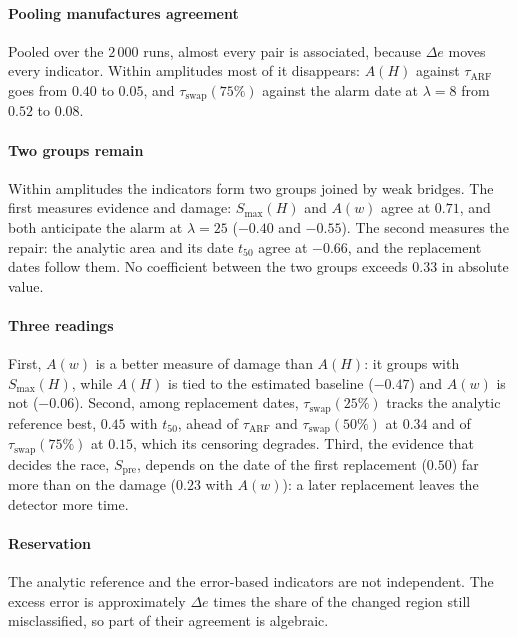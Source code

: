 \documentclass[10pt,conference]{IEEEtran}
\theoremstyle{definition}
\begin{document}
\paragraph{Pooling manufactures agreement} Pooled over the $2\,000$ runs, almost every
pair is associated, because $\Delta e$ moves every indicator. Within amplitudes most of it
disappears: $A(H)$ against $\tau_{\mathrm{ARF}}$ goes from $0.40$ to $0.05$, and
$\tau_{\mathrm{swap}}(75\%)$ against the alarm date at $\lambda = 8$ from $0.52$ to $0.08$.

\paragraph{Two groups remain} Within amplitudes the indicators form two groups joined by
weak bridges. The first measures evidence and damage: $S_{\max}(H)$ and $A(w)$ agree at
$0.71$, and both anticipate the alarm at $\lambda = 25$ ($-0.40$ and $-0.55$). The second
measures the repair: the analytic area and its date $t_{50}$ agree at $-0.66$, and the
replacement dates follow them. No coefficient between the two groups exceeds $0.33$ in
absolute value.

\paragraph{Three readings} First, $A(w)$ is a better measure of damage than $A(H)$: it
groups with $S_{\max}(H)$, while $A(H)$ is tied to the estimated baseline ($-0.47$) and
$A(w)$ is not ($-0.06$). Second, among replacement dates, $\tau_{\mathrm{swap}}(25\%)$
tracks the analytic reference best, $0.45$ with $t_{50}$, ahead of $\tau_{\mathrm{ARF}}$ and
$\tau_{\mathrm{swap}}(50\%)$ at $0.34$ and of $\tau_{\mathrm{swap}}(75\%)$ at $0.15$, which
its censoring degrades. Third, the evidence that decides the race, $S_{\mathrm{pre}}$,
depends on the date of the first replacement ($0.50$) far more than on the damage ($0.23$
with $A(w)$): a later replacement leaves the detector more time.

\paragraph{Reservation} The analytic reference and the error-based indicators are not
independent. The excess error is approximately $\Delta e$ times the share of the changed
region still misclassified, so part of their agreement is algebraic.
\end{document}
